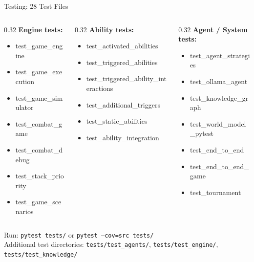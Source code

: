 \documentclass[aspectratio=169, 10pt]{beamer}
\begin{document}
\begin{frame}{Testing: 28 Test Files}
  \begin{columns}[T]
    \begin{column}{0.32\textwidth}
      \footnotesize
      \textbf{Engine tests:}
      \begin{itemize}\scriptsize
        \item test\_game\_engine
        \item test\_game\_execution
        \item test\_game\_simulator
        \item test\_combat\_game
        \item test\_combat\_debug
        \item test\_stack\_priority
        \item test\_game\_scenarios
      \end{itemize}
    \end{column}
    \begin{column}{0.32\textwidth}
      \footnotesize
      \textbf{Ability tests:}
      \begin{itemize}\scriptsize
        \item test\_activated\_abilities
        \item test\_triggered\_abilities
        \item test\_triggered\_ability\_interactions
        \item test\_additional\_triggers
        \item test\_static\_abilities
        \item test\_ability\_integration
      \end{itemize}
    \end{column}
    \begin{column}{0.32\textwidth}
      \footnotesize
      \textbf{Agent / System tests:}
      \begin{itemize}\scriptsize
        \item test\_agent\_strategies
        \item test\_ollama\_agent
        \item test\_knowledge\_graph
        \item test\_world\_model\_pytest
        \item test\_end\_to\_end
        \item test\_end\_to\_end\_game
        \item test\_tournament
      \end{itemize}
    \end{column}
  \end{columns}
  \vspace{0.3cm}
  \begin{center}\footnotesize
    Run: \texttt{pytest tests/} or \texttt{pytest --cov=src tests/}\\
    Additional test directories: \texttt{tests/test\_agents/}, \texttt{tests/test\_engine/}, \texttt{tests/test\_knowledge/}
  \end{center}
\end{frame}
\end{document}
